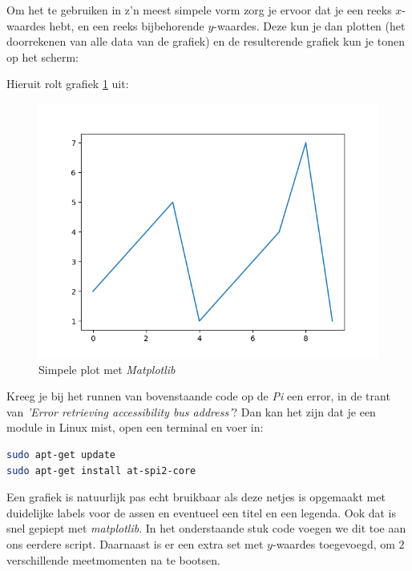 Om het te gebruiken in z'n meest simpele vorm zorg je ervoor dat je een reeks $x$-waardes hebt, en een reeks bijbehorende $y$-waardes. Deze kun je dan plotten (het doorrekenen van alle data van de grafiek) en de resulterende grafiek kun je tonen op het scherm:


Hieruit rolt grafiek \ref{fig:plot1} uit:
\begin{figure}[h!]
\centering\includegraphics[scale=0.7]{Pictures/chapter07/plot1.png}
\caption{Simpele plot met \textit{Matplotlib}}
\label{fig:plot1} %
\end{figure}

\begin{remark}
Kreeg je bij het runnen van bovenstaande code op de \textit{Pi} een error, in de trant van \textit{'Error retrieving accessibility bus address'}? Dan kan het zijn dat je een module in Linux mist, open een terminal en voer in: 
\begin{lstlisting}[language=bash]
sudo apt-get update
sudo apt-get install at-spi2-core
\end{lstlisting}
\end{remark}

Een grafiek is natuurlijk pas echt bruikbaar als deze netjes is opgemaakt met duidelijke labels voor de assen en eventueel een titel en een legenda. Ook dat is snel gepiept met \textit{matplotlib}. In het onderstaande stuk code voegen we dit toe aan ons eerdere script. Daarnaast is er een extra set met $y$-waardes toegevoegd, om $2$ verschillende meetmomenten na te bootsen.

